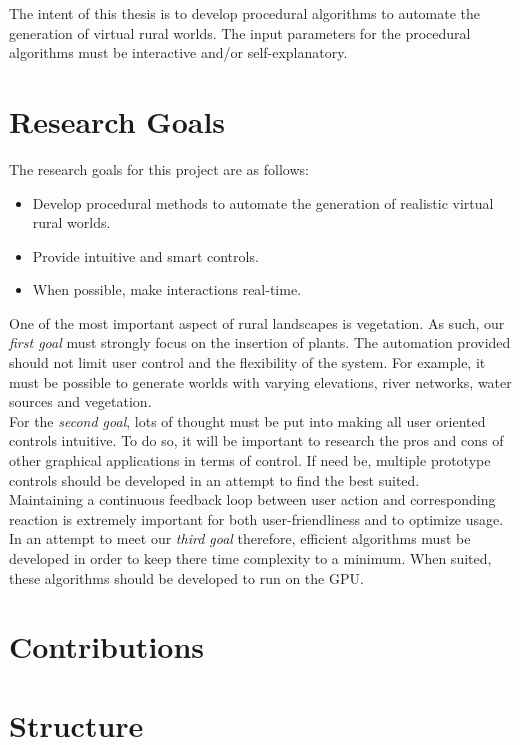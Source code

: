 The intent of this thesis is to develop procedural algorithms to automate the generation of virtual rural worlds. The input parameters for the procedural algorithms must be interactive and/or self-explanatory. 

\newpage
\section{Research Goals}

The research goals for this project are as follows:
\begin{itemize}
\item Develop procedural methods to automate the generation of realistic virtual rural worlds.
\item Provide intuitive and smart controls.
\item When possible, make interactions real-time.
\end{itemize}

One of the most important aspect of rural landscapes is vegetation. As such, our \textit{first goal} must strongly focus on the insertion of plants. The automation provided should not limit user control and the flexibility of the system. For example, it must be possible to generate worlds with varying elevations, river networks, water sources and vegetation.\\

For the \textit{second goal}, lots of thought must be put into making all user oriented controls intuitive. To do so, it will be important to research the pros and cons of other graphical applications in terms of control. If need be, multiple prototype controls should be developed in an attempt to find the best suited.\\

Maintaining a continuous feedback loop between user action and corresponding reaction is extremely important for both user-friendliness and to optimize usage. In an attempt to meet our \textit{third goal} therefore, efficient algorithms must be developed in order to keep there time complexity to a minimum. When suited, these algorithms should be developed to run on the GPU. \\

\section{Contributions}

\section{Structure}

